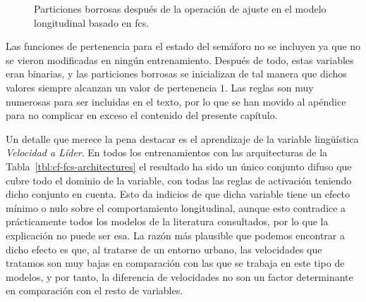 \begin{figure}
	\centering
	\qquad
	\qquad
	\qquad
	\caption[Particiones borrosas después de la operación de ajuste en el modelo longitudinal basado en \acrshort{fcs}]{Particiones borrosas después de la operación de ajuste en el modelo longitudinal basado en \acrshort{fcs}.}
	\label{fig:adjusted-fuzzy-partitions}
\end{figure}

Las funciones de pertenencia para el estado del semáforo no se incluyen ya que no se vieron modificadas en ningún entrenamiento. Después de todo, estas variables eran binarias, y las particiones borrosas se inicializan de tal manera que dichos valores siempre alcanzan un valor de pertenencia $1$. Las reglas son muy numerosas para ser incluidas en el texto, por lo que se han movido al apéndice  para no complicar en exceso el contenido del presente capítulo.

Un detalle que merece la pena destacar es el aprendizaje de la variable lingüística \textit{Velocidad a Líder}. En todos los entrenamientos con las arquitecturas de la Tabla~\ref{tbl:cf-fcs-architectures} el resultado ha sido un único conjunto difuso que cubre todo el dominio de la variable, con todas las reglas de activación teniendo dicho conjunto en cuenta. Esto da indicios de que dicha variable tiene un efecto mínimo o nulo sobre el comportamiento longitudinal, aunque esto contradice a prácticamente todos los modelos de la literatura consultados, por lo que la explicación no puede ser esa. La razón más plausible que podemos encontrar a dicho efecto es que, al tratarse de un entorno urbano, las velocidades que tratamos son muy bajas en comparación con las que se trabaja en este tipo de modelos, y por tanto, la diferencia de velocidades no son un factor determinante en comparación con el resto de variables.

